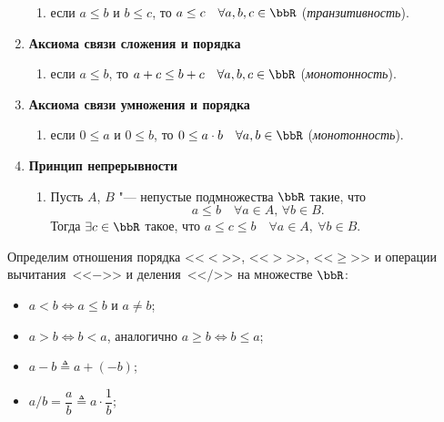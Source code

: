 \begin{enumerate}[label=\Roman*.]
\begin{enumerate}[resume, label=\arabic*.]
\item
если $a\le b$ и $b\le c$, то $a\le c\quad \forall a,b,c\in \bbR$ (\textit{транзитивность}).
\end{enumerate}
\item
\textbf{Аксиома связи сложения и порядка}
\begin{enumerate}[resume, label=\arabic*.]
\item 
если $ a \le b$, то $ a + c \le b + c\quad \forall a,b,c \in \bbR$ (\textit{монотонность}).
\end{enumerate}
\item
\textbf{Аксиома связи умножения и порядка}
\begin{enumerate}[resume, label=\arabic*.]
\item 
если $ 0 \le a$ и $0\le b$, то $ 0 \le a\cdot b\quad \forall a,b \in \bbR$ (\textit{монотонность}).
\end{enumerate}
\item
\textbf{Принцип непрерывности}
\begin{enumerate}[resume, label=\arabic*.]
\item 
Пусть $A$, $B$ "--- непустые подмножества $\bbR$ такие, что
$$
a\le b\quad \forall a \in A, \,  \forall b \in B.
$$
Тогда $\exists c \in \bbR$ такое, что $a\le c\le b\quad \forall a \in A,\ \forall b\in B.$
\end{enumerate}
\end{enumerate}
\enlargethispage{\baselineskip}
\begin{defn}
Определим отношения порядка <<$<$>>, <<$>$>>, <<$\ge$>> и операции вычитания~<<$-$>> и деления~<<$/$>> на множестве $\bbR$:
\begin{itemize}[noitemsep,  topsep=0pt]
\item 
$a < b \Longleftrightarrow a \le b \text{ и } a\neq b$;
\item
$a > b \Longleftrightarrow b < a$, аналогично $a \ge b \Longleftrightarrow b \le a$;
\item
$a - b \triangleq a + (-b)$;
\item
$a / b =  \dfrac{a}{b} \triangleq a \cdot \dfrac{1}{b}$; 
\end{itemize}
\end{defn}

